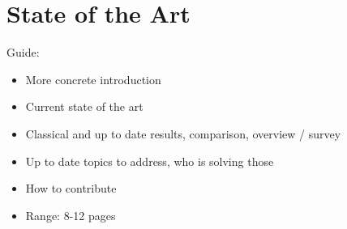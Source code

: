 \documentclass[
  digital, %
  twoside, %
  table,   %
  lof,     %
  lot,     %
]{fithesis3}
\begin{document}
\chapter{State of the Art}
\begin{shaded}
Guide:
\begin{itemize}
    \item More concrete introduction
    \item Current state of the art
    \item Classical and up to date results, comparison, overview / survey
    \item Up to date topics to address, who is solving those
    \item How to contribute
    \item Range: 8-12 pages
\end{itemize}
\end{shaded}
\end{document}
